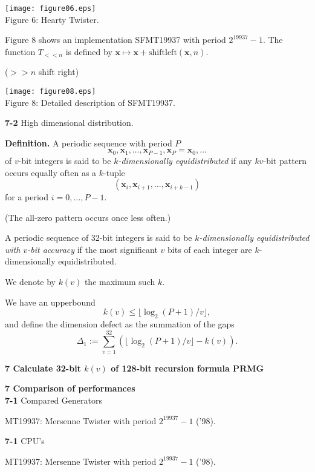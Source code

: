 \documentclass[a4j,12pt,landscape]{jarticle}
\def\bx{{{\mathbf x}}}
\begin{document}
\begin{center}
\texttt{[image: figure06.eps]}
\\
Figure 6: Hearty Twister.
\\
\end{center}

\newpage
Figure 8 shows an implementation SFMT19937 with period $2^{19937}-1$.
The function $T_{<< n}$ is defined by 
$\bx \mapsto \bx + {\mathrm{shiftleft}(\bx, n)}$.

($>> n$ shift right)

\begin{center}
\texttt{[image: figure08.eps]}
\\
Figure 8: Detailed description of SFMT19937.
\end{center}


\newpage
\noindent
{\bf 7-2} High dimensional distribution.

{\bf Definition.} 
A periodic sequence with period $P$
$$\bx_0, \bx_1, \ldots, \bx_{P-1}, \bx_P=\bx_0, \ldots$$
of $v$-bit integers is said to be {\em $k$-dimensionally equidistributed}
if any $kv$-bit pattern occurs equally often as a $k$-tuple
$$
(\bx_i, \bx_{i+1}, \ldots, \bx_{i+k-1})
$$
for a period $i=0,\ldots, P-1$. 

(The all-zero pattern occurs once less often.)

\newpage
A periodic sequence of 32-bit integers is said to be
{\em $k$-dimensionally equidistributed with $v$-bit accuracy}
if the most significant $v$ bits of each integer are
$k$-dimensionally equidistributed. 

We denote by $k(v)$ the maximum such $k$. 

\vskip 5mm
We have an upperbound 
$$
k(v) \leq \lfloor \log_2 (P+1) / v \rfloor, 
$$
and define the dimension defect as the summation of the gaps 
$$
\Delta_1 := \sum_{v=1}^{32}(\lfloor \log_2 (P+1) / v \rfloor -k(v)).
$$

\newpage
{\bf 7 Calculate 32-bit $k(v)$ of 128-bit recursion formula PRMG}

\newpage
\noindent
{\bf 7 Comparison of performances}
\\
{\bf 7-1} Compared Generators 
\begin{description}
\item MT19937: Mersenne Twister with period $2^{19937}-1$ ('98).
\end{description}
{\bf 7-1} CPU's
\begin{description}
\item MT19937: Mersenne Twister with period $2^{19937}-1$ ('98).
\end{description}
\newpage
\end{document}
